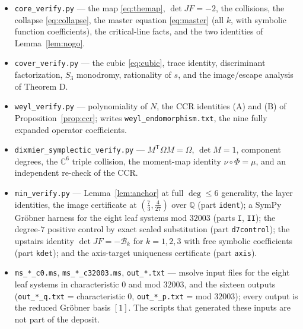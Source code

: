 \documentclass[11pt]{amsart}
\newcommand{\CC}{\mathbb{C}}
\newcommand{\QQ}{\mathbb{Q}}
\newcommand{\brk}{\mathcal{B}}
\theoremstyle{plain}
\theoremstyle{definition}
\theoremstyle{remark}
\begin{document}
\begin{itemize}
\item \texttt{core\_verify.py} --- the map \eqref{eq:themap}, $\det JF=-2$,
the collisions, the collapse \eqref{eq:collapse}, the master equation
\eqref{eq:master} (all $k$, with symbolic function coefficients), the
critical-line facts, and the two identities of Lemma~\ref{lem:nogo}.
\item \texttt{cover\_verify.py} --- the cubic \eqref{eq:cubic}, trace
identity, discriminant factorization, $S_{3}$ monodromy, rationality of
$s$, and the image/escape analysis of Theorem D.
\item \texttt{weyl\_verify.py} --- polynomiality of $N$, the CCR
identities (A) and (B) of Proposition~\ref{prop:ccr}; writes
\texttt{weyl\_endomorphism.txt}, the nine fully expanded operator
coefficients.
\item \texttt{dixmier\_symplectic\_verify.py} --- $M^{\mathsf T}\Omega
M=\Omega$, $\det M=1$, component degrees, the $\CC^{6}$ triple collision,
the moment-map identity $\nu\circ\Phi=\mu$, and an independent re-check
of the CCR.
\item \texttt{min\_verify.py} --- Lemma~\ref{lem:anchor} at full
$\deg\le6$ generality, the layer identities, the image certificate at
$(\tfrac73,\tfrac{4}{27})$ over $\QQ$ (part \texttt{ident}); a SymPy
Gr\"obner harness for the eight leaf systems mod $32003$ (parts
\texttt{I}, \texttt{II}); the degree-$7$ positive control by exact
scaled substitution (part \texttt{d7control}); the upstairs identity
$\det JF=-\brk_{k}$ for $k=1,2,3$ with free symbolic coefficients (part
\texttt{kdet}); and the axis-target uniqueness certificate (part
\texttt{axis}).
\item \texttt{ms\_*\_c0.ms}, \texttt{ms\_*\_c32003.ms},
\texttt{out\_*.txt} --- msolve input files for the eight leaf systems in
characteristic $0$ and mod $32003$, and the sixteen outputs
(\texttt{out\_*\_q.txt} = characteristic $0$,
\texttt{out\_*\_p.txt} = mod $32003$); every output is the reduced
Gr\"obner basis $[1]$. The scripts that generated these inputs are not
part of the deposit.
\end{itemize}
\end{document}

